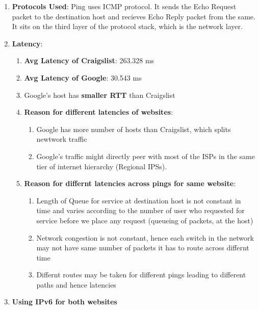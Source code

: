 \documentclass[12pt]{article}
\begin{document}
\begin{enumerate}
    \item \textbf{Protocols Used}: Ping uses ICMP protocol. It sends the Echo Request packet to the destination host and recieves Echo Reply packet from the same. It sits on the third layer of the protocol stack, which is the network layer.
    \item \textbf{Latency}:
    \begin{enumerate}
        \item \textbf{Avg Latency of Craigslist}: 263.328 ms
        \item \textbf{Avg Latency of Google}: 30.543 ms
        \item Google's host has \textbf{smaller RTT} than Craigslist
        \item \textbf{Reason for different latencies of websites}:
        \begin{enumerate}
            \item Google has more number of hosts than Craigslist, which splits newtwork traffic
            \item Google's traffic might directly peer with most of the ISPs in the same tier of internet hierarchy (Regional IPSs).
        \end{enumerate}
        \item \textbf{Reason for differnt latencies across pings for same website}:
        \begin{enumerate}
            \item Length of Queue for service at destination host is not constant in time and varies according to the number of user who requested for service before we place any request (queueing of packets, at the host)
            \item Network congestion is not constant, hence each switch in the network may not have same number of packets it has to route across differnt time
            \item Differnt routes may be taken for different pings leading to different paths and hence latencies
        \end{enumerate}
    \end{enumerate}
    \item \textbf{Using IPv6 for both websites}

\end{enumerate}
\end{document}
